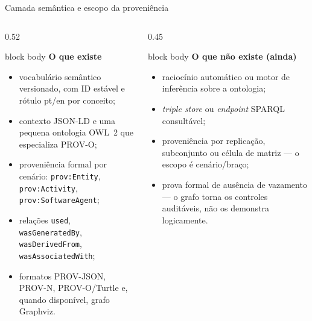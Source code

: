 \begin{frame}{Camada semântica e escopo da proveniência}
  \begin{columns}[T,onlytextwidth]
    \begin{column}{0.52\textwidth}
      \begin{beamercolorbox}[wd=\linewidth,sep=.09cm,rounded=true]{block body}
        {\sffamily\bfseries\fontsize{8.6}{10.2}\selectfont\color{CoInfoBlue}O que existe}\par\vspace{.03cm}
        \begin{itemize}\fontsize{7.7}{9.1}\selectfont\setlength{\itemsep}{.02cm}
          \item vocabulário semântico versionado, com ID estável e rótulo pt/en por conceito;
          \item contexto JSON-LD e uma pequena ontologia OWL~2 que especializa PROV-O;
          \item proveniência formal por cenário: \texttt{prov:Entity}, \texttt{prov:Activity}, \texttt{prov:SoftwareAgent};
          \item relações \texttt{used}, \texttt{wasGeneratedBy}, \texttt{wasDerivedFrom}, \texttt{wasAssociatedWith};
          \item formatos PROV-JSON, PROV-N, PROV-O/Turtle e, quando disponível, grafo Graphviz.
        \end{itemize}
      \end{beamercolorbox}
    \end{column}
    \begin{column}{0.45\textwidth}
      \begin{beamercolorbox}[wd=\linewidth,sep=.09cm,rounded=true]{block body}
        {\sffamily\bfseries\fontsize{8.6}{10.2}\selectfont\color{CoInfoRose}O que não existe (ainda)}\par\vspace{.03cm}
        \begin{itemize}\fontsize{7.7}{9.1}\selectfont\setlength{\itemsep}{.02cm}
          \item raciocínio automático ou motor de inferência sobre a ontologia;
          \item \emph{triple store} ou \emph{endpoint} SPARQL consultável;
          \item proveniência por replicação, subconjunto ou célula de matriz --- o escopo é cenário/braço;
          \item prova formal de ausência de vazamento --- o grafo torna os controles auditáveis, não os demonstra logicamente.
        \end{itemize}
      \end{beamercolorbox}
    \end{column}
  \end{columns}


\end{frame}

